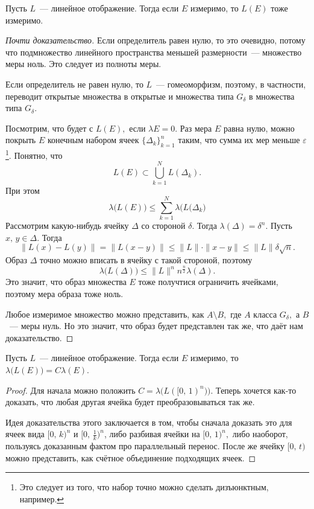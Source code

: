 \documentclass{notes}
\begin{document}
	\begin{thm}
		Пусть $L$~--- линейное отображение. Тогда если $E$ измеримо, то $L(E)$ тоже измеримо.
		\begin{proof}[Почти доказательство]
			Если определитель равен нулю, то это очевидно, потому что подмножество линейного пространства меньшей размерности~--- множество меры ноль. Это следует из полноты меры.

			Если определитель не равен нулю, то $L$~--- гомеоморфизм, поэтому, в частности, переводит открытые множества в открытые и множества типа $G_{\delta}$ в множества типа $G_{\delta}$.

			Посмотрим, что будет с $L(E),$ если $\lambda E = 0$. Раз мера $E$ равна нулю, можно покрыть $E$ конечным набором ячеек $\{\Delta_k\}_{k = 1}^n$ таким, что сумма их мер меньше $\varepsilon$\footnote{Это следует из того, что набор точно можно сделать дизъюнктным, например.}. Понятно, что
			\[
				L(E) \subset \bigcup\limits_{k = 1}^N L(\Delta_k).
			\]
			При этом
			\[
				\lambda \big(L(E)\big) \leqslant \sum\limits_{k = 1}^N \lambda \big(L(\Delta_k\big)
			\]
			Рассмотрим какую-нибудь ячейку $\Delta$ со стороной $\delta$. Тогда $\lambda(\Delta) = \delta^n$. Пусть $x, \, y \in \Delta$. Тогда
			\[
				\|L(x) - L(y)\| = \|L(x - y)\| \leqslant \|L\| \cdot \|x - y\| \leqslant \|L\| \delta \sqrt{n}.
			\]
			Образ $\Delta$ точно можно вписать в ячейку с такой стороной, поэтому
			\[
				\lambda \big(L(\Delta)\big) \leqslant \|L\|^n n^{\tfrac{n}{2}} \lambda(\Delta).
			\]
			Это значит, что образ множества $E$ тоже получтися ограничить ячейками, поэтому мера образа тоже ноль.

			Любое измеримое множество можно представить, как $A \setminus B,$ где $A$ класса $G_{\delta},$ а $B$~--- меры нуль. Но это значит, что образ будет представлен так же, что даёт нам доказательство.
		\end{proof}
	\end{thm}

	\begin{thm}
		Пусть $L$~--- линейное отображение. Тогда если $E$ измеримо, то $\lambda\big(L(E)\big) = C \lambda(E)$.
		\begin{proof}
			Для начала можно положить $C = \lambda\big(L([0, \, 1)^n\big))$. Теперь хочется как-то доказать, что любая другая ячейка будет преобразовываться так же.

			Идея доказательства этого заключается в том, чтобы сначала доказать это для ячеек вида $[0, \, k)^n$ и $[0, \, \tfrac{1}{k})^n$, либо разбивая ячейки на $[0, \, 1)^n,$ либо наоборот, пользуясь доказанным фактом про параллельный перенос. После же ячейку $[0, \, t)$ можно представить, как счётное объединение подходящих ячеек.
		\end{proof}
	\end{thm}
\end{document}

